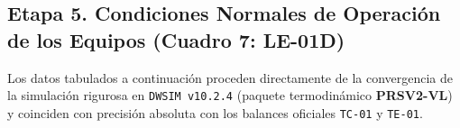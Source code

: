 \documentclass[10pt,letterpaper]{article}
\begin{document}
\newpage
\begin{landscape}
\section{Etapa 5. Condiciones Normales de Operación de los Equipos (Cuadro 7: LE-01D)}

Los datos tabulados a continuación proceden directamente de la convergencia de la simulación rigurosa en \texttt{DWSIM v10.2.4} (paquete termodinámico \textbf{PRSV2-VL}) y coinciden con precisión absoluta con los balances oficiales \texttt{TC-01} y \texttt{TE-01}.


\end{landscape}
\end{document}
